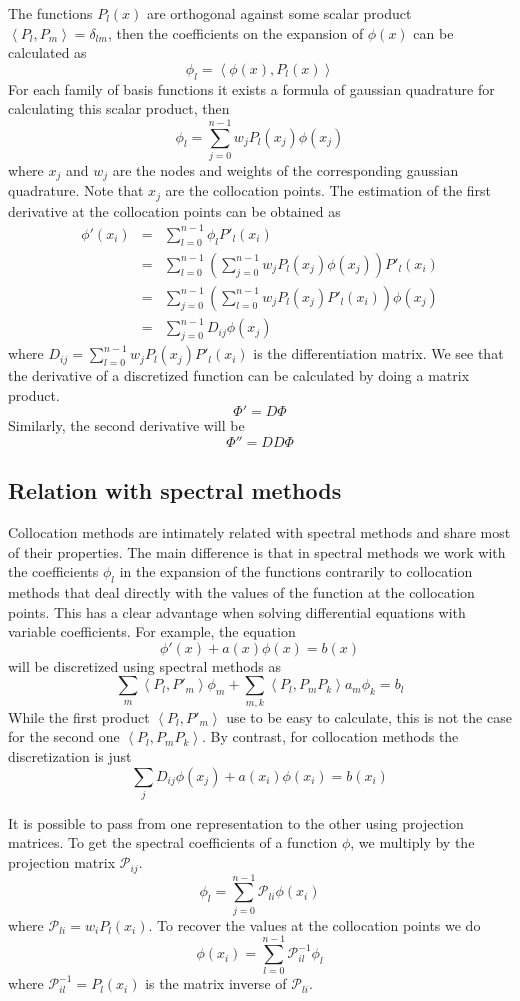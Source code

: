The functions $P_l(x)$ are orthogonal against some scalar product $\left<P_l,P_m\right>=\delta_{lm}$,
then the coefficients on the expansion of $\phi(x)$ can be calculated as
$$\phi_l=\left<\phi(x),P_l(x)\right>$$
For each family of basis functions it exists a formula of gaussian quadrature for calculating this
scalar product, then
$$\phi_l=\sum_{j=0}^{n-1}w_jP_l(x_j)\phi(x_j)$$
where $x_j$ and $w_j$ are the nodes and weights of the corresponding gaussian quadrature. Note
that $x_j$ are the collocation points. The estimation of the first derivative at the collocation 
points can be obtained as
$$\begin{array}{rcl}
\phi'(x_i)&=&\displaystyle\sum_{l=0}^{n-1}\phi_lP'_l(x_i)\\
&=&\displaystyle\sum_{l=0}^{n-1}\left(\sum_{j=0}^{n-1}w_jP_l(x_j)\phi(x_j)\right)P'_l(x_i)\\
&=&\displaystyle\sum_{j=0}^{n-1}\left(\sum_{l=0}^{n-1}w_jP_l(x_j)P'_l(x_i)\right)\phi(x_j)\\
&=&\displaystyle\sum_{j=0}^{n-1}D_{ij}\phi(x_j)
\end{array}$$
where $D_{ij}=\displaystyle\sum_{l=0}^{n-1}w_jP_l(x_j)P'_l(x_i)$ is the differentiation matrix.
We see that the derivative of a discretized function can be calculated
by doing a matrix product.
$$\Phi'=D\Phi$$
Similarly, the second derivative will be 
$$\Phi''=DD\Phi$$

\subsection{Relation with spectral methods}

Collocation methods are intimately related with spectral methods and share most of their properties.
The main difference is that in spectral methods we work with the coefficients $\phi_l$ in 
the expansion of the functions contrarily to collocation methods that deal directly with the values
of the function at the collocation points. This has a clear advantage when solving differential
equations with variable coefficients. For example, the equation
$$\phi'(x)+a(x)\phi(x)=b(x)$$
will be discretized using spectral methods as
$$\sum_m\left<P_l,P'_m\right>\phi_m+\sum_{m,k}\left<P_l,P_mP_k\right>a_m\phi_k=b_l$$
While the first product $\left<P_l,P'_m\right>$ use to be easy to calculate, this is not the case
for the second one $\left<P_l,P_mP_k\right>$. By contrast, for collocation methods the discretization
is just
$$\sum_jD_{ij}\phi(x_j)+a(x_i)\phi(x_i)=b(x_i)$$

It is possible to pass from one representation to the other using projection matrices. 
To get the spectral coefficients of a function $\phi$, we multiply by the projection matrix $\mathcal{P}_{ij}$.
$$\phi_l=\sum_{j=0}^{n-1}\mathcal{P}_{li}\phi(x_i)$$
where $\mathcal{P}_{li}=w_iP_l(x_i)$. To recover the values at the collocation points we do
$$\phi(x_i)=\sum_{l=0}^{n-1}\mathcal{P}^{-1}_{il}\phi_l$$
where $\mathcal{P}^{-1}_{il}=P_l(x_i)$ is the matrix inverse of $\mathcal{P}_{li}$.

